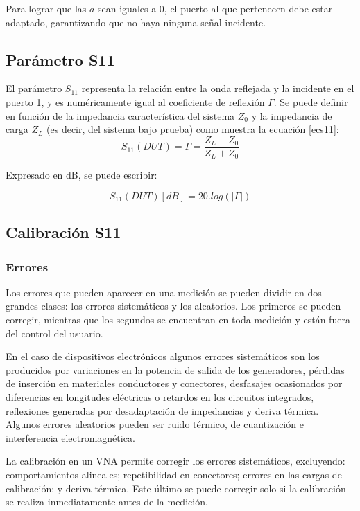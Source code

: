 Para lograr que las $a$ sean iguales a 0, el puerto al que pertenecen debe estar adaptado, garantizando que no haya ninguna señal incidente. 

\subsection{Parámetro S11}
El parámetro $S_{11}$ representa la relación entre la onda reflejada y la incidente en el puerto 1, y es numéricamente igual al coeficiente de reflexión $\Gamma$. Se puede definir en función de la impedancia característica del sistema $Z_{0}$ y la impedancia de carga $Z_{L}$ (es decir, del sistema bajo prueba) como muestra la ecuación \ref{ecs11}:
\begin{equation}
    \label{ecs11}
    S_{11}(DUT) = \Gamma = \frac{Z_{L}-Z_{0}}{Z_{L}+Z_{0}}
\end{equation}

Expresado en dB, se puede escribir:

\begin{equation}
    S_{11}(DUT)[dB]= 20 . log(|\Gamma|)
\end{equation}

\subsection{Calibración S11}
\subsubsection{Errores}
\label{sec:errores}
Los errores que pueden aparecer en una medición se pueden dividir en dos grandes clases: los errores sistemáticos y los aleatorios. Los primeros se pueden corregir, mientras que los segundos se encuentran en toda medición y están fuera del control del usuario.

En el caso de dispositivos electrónicos algunos errores sistemáticos son los producidos por variaciones en la potencia de salida de los generadores, pérdidas de inserción en materiales conductores y conectores, desfasajes ocasionados por diferencias en longitudes eléctricas o retardos en los circuitos integrados, reflexiones generadas por desadaptación de impedancias y deriva térmica. Algunos errores aleatorios pueden ser ruido térmico, de cuantización e interferencia electromagnética.

La calibración en un VNA permite corregir los errores sistemáticos, excluyendo: comportamientos alineales; repetibilidad en conectores; errores en las cargas de calibración; y deriva térmica. Este último se puede corregir solo si la calibración se realiza inmediatamente antes de la medición.

